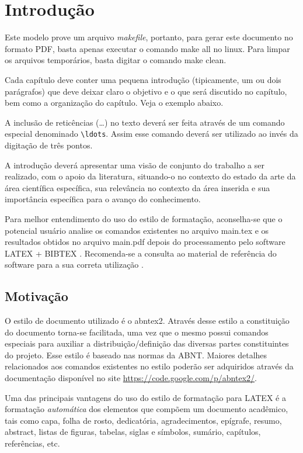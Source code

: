 %
%

\chapter{Introdução}\label{chap:introducao}

Este modelo prove um arquivo \textit{makefile}, portanto, para gerar este documento no formato PDF, basta apenas executar o comando {\ttfamily make all} no linux. Para limpar os arquivos temporários, basta digitar o comando {\ttfamily make clean}.

Cada capítulo deve conter uma pequena introdução (tipicamente, um ou dois parágrafos) que deve deixar claro o objetivo e o que será discutido no capítulo, bem como a organização do capítulo.
Veja o exemplo abaixo.

A inclusão de reticências (\ldots) no texto deverá ser feita através de um comando especial denominado \verb|\ldots|.
Assim esse comando deverá ser utilizado ao invés da digitação de três pontos.

A introdução deverá apresentar uma visão de conjunto do trabalho a ser realizado, com o apoio da literatura, situando-o no contexto do estado da arte da área científica específica, sua relevância no contexto da área inserida e sua importância específica para o avanço do conhecimento.

Para melhor entendimento do uso do estilo de formatação, aconselha-se que o potencial usuário analise os comandos existentes no arquivo {\ttfamily main.tex} e os resultados obtidos no arquivo {\ttfamily main.pdf} depois do processamento pelo software LATEX + BIBTEX \cite{LaTeX2009,BibTeX2009}.
Recomenda-se a consulta ao material de referência do software para a sua correta utilização \cite{Lamport1986,Buerger1989,Kopka2003,Mittelbach2004}.

\section{Motivação}
\label{sec:motivacao}

O estilo de documento utilizado é o {\ttfamily abntex2}.
Através desse estilo a constituição do documento torna-se facilitada, uma vez que o mesmo possui comandos especiais para auxiliar a distribuição/definição das diversas partes constituintes do projeto.
Esse estilo é baseado nas normas da ABNT.
Maiores detalhes relacionados aos comandos existentes no estilo poderão ser adquiridos através da documentação disponível no site \href{https://code.google.com/p/abntex2/}{https://code.google.com/p/abntex2/}.

Uma das principais vantagens do uso do estilo de formatação para LATEX é a formatação \textit{automática} dos elementos que compõem um documento acadêmico, tais como capa, folha de rosto, dedicatória, agradecimentos, epígrafe, resumo, abstract, listas de figuras, tabelas, siglas e símbolos, sumário, capítulos, referências, etc.
